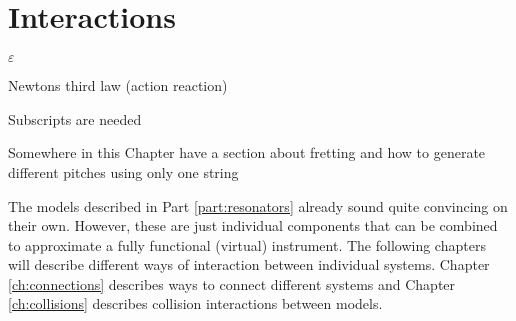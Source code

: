 \chapter*{Interactions}
\renewcommand\theequation{\Roman{part}.\arabic{equation}}



$\varepsilon$

Newtons third law (action reaction)

Subscripts are needed

Somewhere in this Chapter have a section about fretting and how to generate different pitches using only one string

The models described in Part \ref{part:resonators} already sound quite convincing on their own. However, these are just individual components that can be combined to approximate a fully functional (virtual) instrument. The following chapters will describe different ways of interaction between individual systems. Chapter \ref{ch:connections} describes ways to connect different systems and Chapter \ref{ch:collisions} describes collision interactions between models. 

\renewcommand\theequation{\arabic{chapter}.\arabic{equation}}
